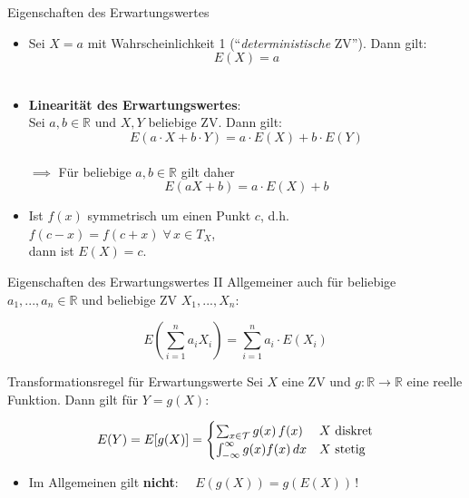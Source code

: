 \documentclass[
  10pt,
  ignorenonframetext,
]{beamer}
\providecommand{\tightlist}{%
  \setlength{\itemsep}{0pt}\setlength{\parskip}{0pt}}
\begin{document}
\begin{frame}{Eigenschaften des Erwartungswertes}
\label{eigenschaften-des-erwartungswertes}
\begin{itemize}
\item
  Sei \(X = a\) mit Wahrscheinlichkeit 1 (``\emph{deterministische}
  ZV''). Dann gilt: \[E(X) = a\] ~
\item
  \textbf{Linearität des Erwartungswertes}:\\
  Sei \(a, b \in \mathbb{R}\) und \(X, Y\) beliebige ZV. Dann gilt:
  \[E(a \cdot X + b \cdot Y) = a \cdot E (X) + b \cdot E (Y)\]\\
  \(\implies\) Für beliebige \(a, b \in \mathbb{R}\) gilt daher
  \[E(aX + b) = a \cdot E(X) + b\]
\item
  Ist \(f(x)\) symmetrisch um einen Punkt \(c\), d.h.
  \(f(c-x) = f(c+x) \;\forall\, x \in T_X\),\\
  dann ist \(E(X) = c\). ~
\end{itemize}

\end{frame}

\begin{frame}{Eigenschaften des Erwartungswertes II}
\label{eigenschaften-des-erwartungswertes-ii}
Allgemeiner auch für beliebige \(a_1, ..., a_n \in \mathbb{R}\) und
beliebige ZV \(X_1, ..., X_n\):

\[E\left( \sum_{i=1}^n a_iX_i \right) = \sum_{i=1}^n a_i \cdot E(X_i)\]
\end{frame}

\begin{frame}{Transformationsregel für Erwartungswerte}
\label{transformationsregel-fuxfcr-erwartungswerte}
Sei \(X\) eine ZV und \(g:\mathbb{R} \to \mathbb{R}\) eine reelle
Funktion. Dann gilt für \(Y = g(X)\):

\[
E(Y) = E[g(X)] = \begin{cases} \sum_{x \in {\cal T}} g(x)\, f(x) & X \text{ diskret} \\
  \int_{-\infty}^\infty g(x) f(x) \,dx & X \text{ stetig} \end{cases}
\]

\begin{itemize}
\tightlist
\item
  Im Allgemeinen gilt \textbf{nicht}: \(\quad E(g(X)) = g(E(X))\,\)!
\end{itemize}

\end{frame}
\end{document}

